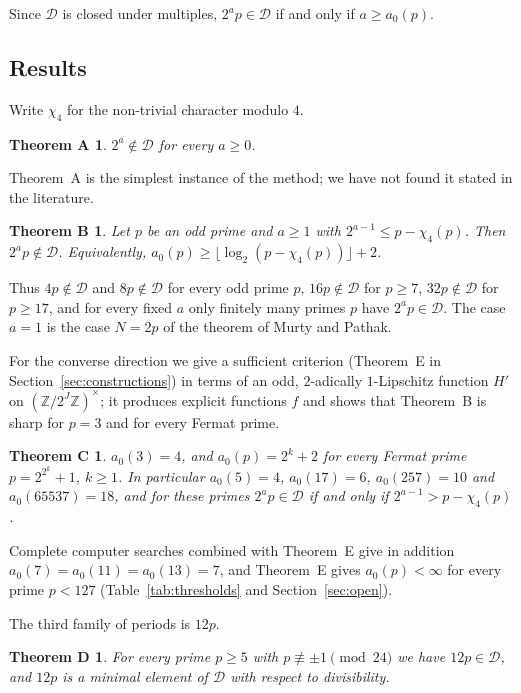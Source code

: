 \documentclass[11pt,a4paper]{article}
\newtheorem*{thmA}{Theorem A}
\newtheorem*{thmB}{Theorem B}
\newtheorem*{thmC}{Theorem C}
\newtheorem*{thmD}{Theorem D}
\theoremstyle{definition}
\theoremstyle{remark}
\newcommand{\Z}{\mathbb{Z}}
\newcommand{\cD}{\mathcal{D}}
\begin{document}
Since $\cD$ is closed under multiples, $2^ap\in\cD$ if and only if $a\ge a_0(p)$.

\subsection{Results}
Write $\chi_4$ for the non-trivial character modulo $4$.

\begin{thmA}
$2^a\notin\cD$ for every $a\ge0$.
\end{thmA}

Theorem~A is the simplest instance of the method; we have not found it stated in the literature.

\begin{thmB}
Let $p$ be an odd prime and $a\ge1$ with $2^{a-1}\le p-\chi_4(p)$. Then $2^ap\notin\cD$. Equivalently, $a_0(p)\ge\lfloor\log_2(p-\chi_4(p))\rfloor+2$.
\end{thmB}

Thus $4p\notin\cD$ and $8p\notin\cD$ for every odd prime $p$, $16p\notin\cD$ for $p\ge7$, $32p\notin\cD$ for $p\ge17$, and for every fixed $a$ only finitely many primes $p$ have $2^ap\in\cD$. The case $a=1$ is the case $N=2p$ of the theorem of Murty and Pathak.

For the converse direction we give a sufficient criterion (Theorem~E in Section~\ref{sec:constructions}) in terms of an odd, $2$-adically $1$-Lipschitz function $H'$ on $(\Z/2^J\Z)^\times$; it produces explicit functions $f$ and shows that Theorem~B is sharp for $p=3$ and for every Fermat prime.

\begin{thmC}
$a_0(3)=4$, and $a_0(p)=2^k+2$ for every Fermat prime $p=2^{2^k}+1$, $k\ge1$. In particular $a_0(5)=4$, $a_0(17)=6$, $a_0(257)=10$ and $a_0(65537)=18$, and for these primes $2^ap\in\cD$ if and only if $2^{a-1}>p-\chi_4(p)$.
\end{thmC}

Complete computer searches combined with Theorem~E give in addition $a_0(7)=a_0(11)=a_0(13)=7$, and Theorem~E gives $a_0(p)<\infty$ for every prime $p<127$ (Table~\ref{tab:thresholds} and Section~\ref{sec:open}).

The third family of periods is $12p$.

\begin{thmD}
For every prime $p\ge5$ with $p\not\equiv\pm1\pmod{24}$ we have $12p\in\cD$, and $12p$ is a minimal element of $\cD$ with respect to divisibility.
\end{thmD}
\end{document}
